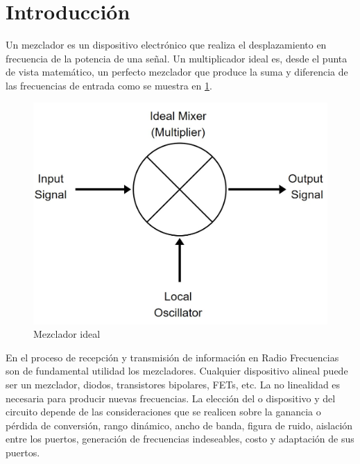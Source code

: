 \documentclass[twocolumn]{article}
\begin{document}
\onecolumn
\tableofcontents
\clearpage

\twocolumn
\section{Introducción}
Un mezclador es un dispositivo electrónico que realiza el desplazamiento en frecuencia de la potencia de una señal. Un multiplicador ideal es, desde el punta de vista matemático, un perfecto mezclador que produce la suma y diferencia de las frecuencias de entrada como se muestra en \textcolor{blue}{\ref{fig:fig0}}.

\begin{figure}[!ht]
  \centering    
	\includegraphics[scale=0.3]{imagenes/fig0.jpg}
	\caption{Mezclador ideal}\label{fig:fig0}
\end{figure}

En el proceso de recepción y transmisión de información en Radio Frecuencias son de fundamental utilidad los mezcladores. Cualquier dispositivo alineal puede ser un mezclador, diodos, transistores bipolares, FETs, etc. La no linealidad es necesaria para producir nuevas frecuencias. La elección del o dispositivo y del circuito depende de las consideraciones que se realicen sobre la ganancia o pérdida de conversión, rango dinámico, ancho de banda, figura de ruido, aislación entre los puertos, generación de frecuencias indeseables, costo y adaptación de sus puertos.
\end{document}
